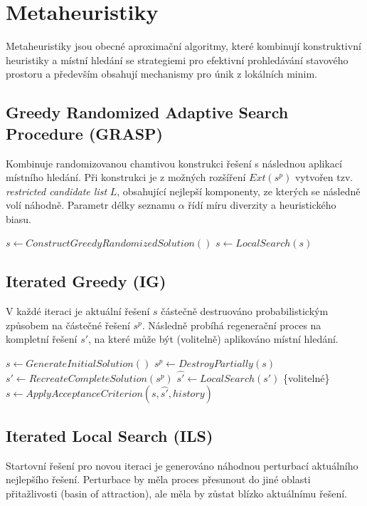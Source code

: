 \documentclass[12pt,a4paper]{article}
\theoremstyle{definition}
\begin{document}
\section{Metaheuristiky}
Metaheuristiky jsou obecné aproximační algoritmy, které kombinují konstruktivní heuristiky a místní hledání se strategiemi pro efektivní prohledávání stavového prostoru a především obsahují mechanismy pro únik z lokálních minim.

\subsection{Greedy Randomized Adaptive Search Procedure (GRASP)}
Kombinuje randomizovanou chamtivou konstrukci řešení s následnou aplikací místního hledání. Při konstrukci je z možných rozšíření $Ext(s^p)$ vytvořen tzv. \textit{restricted candidate list} $L$, obsahující nejlepší komponenty, ze kterých se následně volí náhodně. Parametr délky seznamu $\alpha$ řídí míru diverzity a heuristického biasu.

\begin{algorithm}[H]
\caption{GRASP }
\begin{algorithmic}[1]
\STATE $s \gets ConstructGreedyRandomizedSolution()$ 
\STATE $s \gets LocalSearch(s)$ 
\ENDWHILE
\end{algorithmic}
\end{algorithm}

\subsection{Iterated Greedy (IG)}
V každé iteraci je aktuální řešení $s$ částečně destruováno probabilistickým způsobem na částečné řešení $s^p$. Následně probíhá regenerační proces na kompletní řešení $s'$, na které může být (volitelně) aplikováno místní hledání.

\begin{algorithm}[H]
\caption{Iterated Greedy (IG) }
\begin{algorithmic}[1]
\STATE $s \gets GenerateInitialSolution()$ 
\STATE $s^p \gets DestroyPartially(s)$ 
\STATE $s' \gets RecreateCompleteSolution(s^p)$ 
\STATE $\hat{s'} \gets LocalSearch(s')$ \{volitelné\} 
\STATE $s \gets ApplyAcceptanceCriterion(s, \hat{s'}, history)$ 
\ENDWHILE
\end{algorithmic}
\end{algorithm}

\subsection{Iterated Local Search (ILS)}
Startovní řešení pro novou iteraci je generováno náhodnou perturbací aktuálního nejlepšího řešení. Perturbace by měla proces přesunout do jiné oblasti přitažlivosti (basin of attraction), ale měla by zůstat blízko aktuálnímu řešení.
\end{document}

